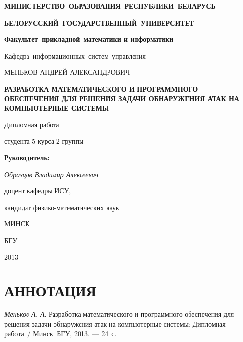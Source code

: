 \titlepage
\begin{center}
	\begin{large}
		\textbf{МИНИСТЕРСТВО~ОБРАЗОВАНИЯ~РЕСПУБЛИКИ~БЕЛАРУСЬ}
		
		\smallskip
		\textbf{БЕЛОРУССКИЙ~ГОСУДАРСТВЕННЫЙ~УНИВЕРСИТЕТ}
		
		\smallskip
		\textbf{Факультет~прикладной~математики и информатики}
		
		\smallskip
		Кафедра~информационных~систем~управления
	\end{large}
\end{center}

\vfill

\begin{center}
	\large {МЕНЬКОВ АНДРЕЙ АЛЕКСАНДРОВИЧ}
	
	\bigskip	
	{\Large \textbf{РАЗРАБОТКА МАТЕМАТИЧЕСКОГО И ПРОГРАММНОГО ОБЕСПЕЧЕНИЯ ДЛЯ РЕШЕНИЯ ЗАДАЧИ ОБНАРУЖЕНИЯ АТАК НА КОМПЬЮТЕРНЫЕ СИСТЕМЫ}}
	
	\bigskip
	Дипломная работа
	
	студента 5 курса 2 группы
\end{center}


\vfill
\begin{flushright}
	\begin{minipage}{7cm}
		\textbf{Руководитель:}
		
		\textit{Образцов Владимир Алексеевич}
		
		доцент кафедры ИСУ,
		
		кандидат физико-математических наук 
	\end{minipage}
\end{flushright}

\vfill

\begin{center}
	МИНСК
	
	БГУ
	
	2013
\end{center}

\newpage

\newcommand{\pagescount}{24}
\section*{АННОТАЦИЯ}

\textit{Меньков А. А}. Разработка математического и программного обеспечения для решения задачи обнаружения атак на компьютерные системы:
Дипломная работа~/ Минск: 
БГУ, 2013. --- \pagescount~с.

